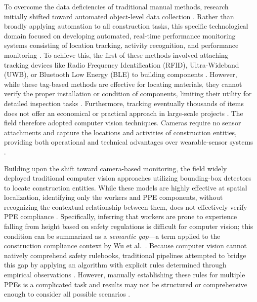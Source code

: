 \documentclass[10pt,letterpaper]{article}
\begin{document}
To overcome the data deficiencies of traditional manual methods, research initially shifted toward automated object-level data collection \cite{tuomisto2026}. Rather than broadly applying automation to all construction tasks, this specific technological domain focused on developing automated, real-time performance monitoring systems consisting of location tracking, activity recognition, and performance monitoring \cite{sherafat2020}. To achieve this, the first of these methods involved attaching tracking devices like Radio Frequency Identification (RFID), Ultra-Wideband (UWB), or Bluetooth Low Energy (BLE) to building components \cite{asadzadeh2020}. However, while these tag-based methods are effective for locating materials, they cannot verify the proper installation or condition of components, limiting their utility for detailed inspection tasks \cite{sherafat2020}. Furthermore, tracking eventually thousands of items does not offer an economical or practical approach in large-scale projects \cite{bohn2010}. The field therefore adopted computer vision techniques. Cameras require no sensor attachments and capture the locations and activities of construction entities, providing both operational and technical advantages over wearable-sensor systems \cite{xiong2019}.

Building upon the shift toward camera-based monitoring, the field widely deployed traditional computer vision approaches utilizing bounding-box detectors to locate construction entities. While these models are highly effective at spatial localization, identifying only the workers and PPE components, without recognizing the contextual relationship between them, does not effectively verify PPE compliance \cite{nath2020}. Specifically, inferring that workers are prone to experience falling from height based on safety regulations is difficult for computer vision; this condition can be summarized as a \textit{semantic gap}---a term applied to the construction compliance context by Wu et al.\ \cite{wu2021}. Because computer vision cannot natively comprehend safety rulebooks, traditional pipelines attempted to bridge this gap by applying an algorithm with explicit rules determined through empirical observations \cite{nath2020}. However, manually establishing these rules for multiple PPEs is a complicated task and results may not be structured or comprehensive enough to consider all possible scenarios \cite{nath2020}.
\end{document}
